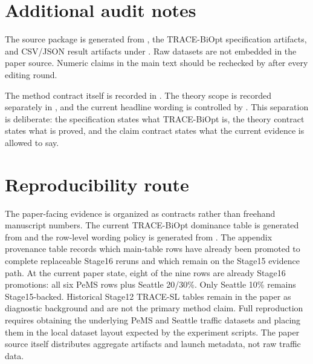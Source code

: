 \section{Additional audit notes}

The source package is generated from , the
TRACE-BiOpt specification artifacts, and CSV/JSON result artifacts under
. Raw datasets are not embedded in the
paper source. Numeric claims in the main text should be rechecked by
 after every editing round.

The method contract itself is recorded in . The
theory scope is recorded separately in , and the
current headline wording is controlled by
. This
separation is deliberate: the specification states what TRACE-BiOpt is, the
theory contract states what is proved, and the claim contract states what the
current evidence is allowed to say.



\FloatBarrier
\section{Reproducibility route}

The paper-facing evidence is organized as contracts rather than freehand
manuscript numbers. The current TRACE-BiOpt dominance table is generated from
and the row-level wording policy is generated from
.
The appendix provenance table records which main-table rows have already been
promoted to complete replaceable Stage16 reruns and which remain on the Stage15
evidence path. At the current paper state, eight of the nine rows are already
Stage16 promotions: all six PeMS rows plus Seattle 20/30\%. Only Seattle 10\%
remains Stage15-backed.
Historical Stage12 TRACE-SL tables remain in the paper as diagnostic background
and are not the primary method claim. Full reproduction requires obtaining the
underlying PeMS and Seattle traffic datasets and placing them in the local
dataset layout expected by the experiment scripts. The paper source itself
distributes aggregate artifacts and launch metadata, not raw traffic data.



